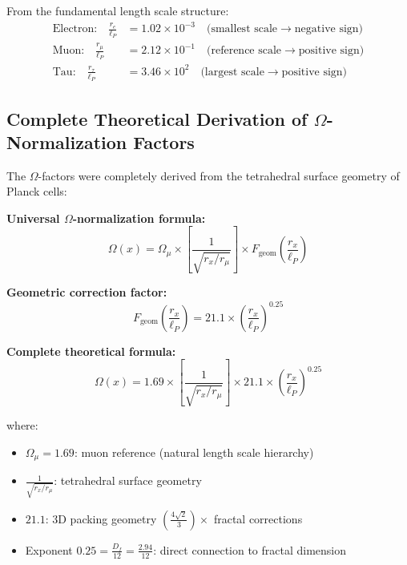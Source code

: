 \documentclass[12pt,a4paper]{article}
\numberwithin{equation}{section}
\newcommand{\Df}{D_f}
\newcommand{\lP}{\ell_P}
\newcommand{\Omegafactor}{\Omega}
\begin{document}
	From the fundamental length scale structure:
	\begin{align}
		\text{Electron:} \quad \frac{r_e}{\ell_P} &= 1.02 \times 10^{-3} \quad \text{(smallest scale} \rightarrow \text{negative sign)}\\
		\text{Muon:} \quad \frac{r_\mu}{\ell_P} &= 2.12 \times 10^{-1} \quad \text{(reference scale} \rightarrow \text{positive sign)}\\
		\text{Tau:} \quad \frac{r_\tau}{\ell_P} &= 3.46 \times 10^{2} \quad \text{(largest scale} \rightarrow \text{positive sign)}
		\label{eq:length_scales}
	\end{align}
	
	\subsection{Complete Theoretical Derivation of $\Omega$-Normalization Factors}
	
	The $\Omega$-factors were completely derived from the tetrahedral surface geometry of Planck cells:
	
	\textbf{Universal $\Omegafactor$-normalization formula:}
	\begin{equation}
		\Omegafactor(x) = \Omegafactor_\mu \times \left[\frac{1}{\sqrt{r_x/r_\mu}}\right] \times F_{\text{geom}}\left(\frac{r_x}{\lP}\right)
		\label{eq:omega_universal}
	\end{equation}
	
	\textbf{Geometric correction factor:}
	\begin{equation}
		F_{\text{geom}}\left(\frac{r_x}{\lP}\right) = 21.1 \times \left(\frac{r_x}{\lP}\right)^{0.25}
		\label{eq:f_geom}
	\end{equation}
	
	\textbf{Complete theoretical formula:}
	\begin{equation}
		\Omegafactor(x) = 1.69 \times \left[\frac{1}{\sqrt{r_x/r_\mu}}\right] \times 21.1 \times \left(\frac{r_x}{\lP}\right)^{0.25}
		\label{eq:omega_complete}
	\end{equation}
	
	where:
	\begin{itemize}
		\item $\Omega_\mu = 1.69$: muon reference (natural length scale hierarchy)
		\item $\frac{1}{\sqrt{r_x/r_\mu}}$: tetrahedral surface geometry
		\item $21.1$: 3D packing geometry $\left(\frac{4\sqrt{2}}{3}\right) \times$ fractal corrections
		\item Exponent $0.25 = \frac{\Df}{12} = \frac{2.94}{12}$: direct connection to fractal dimension
	\end{itemize}
	
\end{document}

